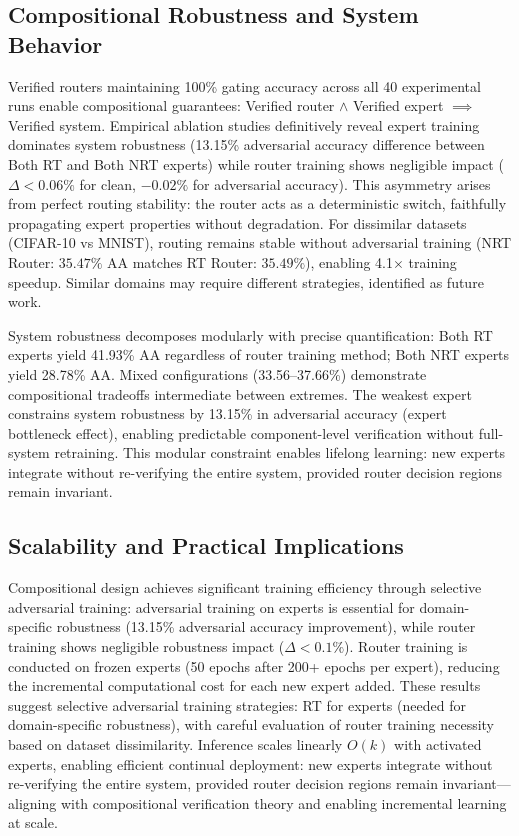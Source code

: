 \documentclass[11pt,a4paper]{article}
\begin{document}
\subsection{Compositional Robustness and System Behavior}

Verified routers maintaining 100\% gating accuracy across all 40 experimental runs enable compositional guarantees: Verified router $\land$ Verified expert $\implies$ Verified system. Empirical ablation studies definitively reveal expert training dominates system robustness (13.15\% adversarial accuracy difference between Both RT and Both NRT experts) while router training shows negligible impact ($\Delta < 0.06\%$ for clean, $-0.02\%$ for adversarial accuracy). This asymmetry arises from perfect routing stability: the router acts as a deterministic switch, faithfully propagating expert properties without degradation. For dissimilar datasets (CIFAR-10 vs MNIST), routing remains stable without adversarial training (NRT Router: $35.47\%$ AA matches RT Router: $35.49\%$), enabling 4.1$\times$ training speedup. Similar domains may require different strategies, identified as future work.

System robustness decomposes modularly with precise quantification: Both RT experts yield 41.93\% AA regardless of router training method; Both NRT experts yield 28.78\% AA. Mixed configurations (33.56--37.66\%) demonstrate compositional tradeoffs intermediate between extremes. The weakest expert constrains system robustness by 13.15\% in adversarial accuracy (expert bottleneck effect), enabling predictable component-level verification without full-system retraining. This modular constraint enables lifelong learning: new experts integrate without re-verifying the entire system, provided router decision regions remain invariant.

\subsection{Scalability and Practical Implications}

Compositional design achieves significant training efficiency through selective adversarial training: adversarial training on experts is essential for domain-specific robustness (13.15\% adversarial accuracy improvement), while router training shows negligible robustness impact ($\Delta < 0.1\%$). Router training is conducted on frozen experts (50 epochs after 200+ epochs per expert), reducing the incremental computational cost for each new expert added. These results suggest selective adversarial training strategies: RT for experts (needed for domain-specific robustness), with careful evaluation of router training necessity based on dataset dissimilarity. Inference scales linearly $O(k)$ with activated experts, enabling efficient continual deployment: new experts integrate without re-verifying the entire system, provided router decision regions remain invariant—aligning with compositional verification theory and enabling incremental learning at scale.
\end{document}
